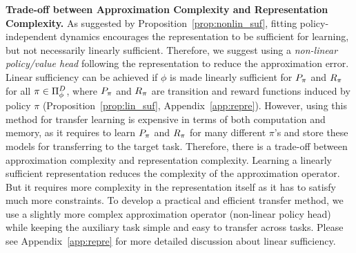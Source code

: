 \textbf{Trade-off between Approximation Complexity and Representation Complexity.}
As suggested by Proposition~\ref{prop:nonlin_suf}, fitting policy-independent dynamics encourages the representation to be sufficient for learning, but not necessarily linearly sufficient. Therefore, we suggest using a \textit{non-linear policy/value head} following the representation to reduce the approximation error. 
Linear sufficiency can be achieved if $\phi$ is made linearly sufficient for $P_\pi$ and $R_\pi$ for all $\pi\in\Pi_{\phi}^D$, where $P_\pi$ and $R_\pi$ are transition and reward functions induced by policy $\pi$ (Proposition~\ref{prop:lin_suf}, Appendix~\ref{app:repre}).
However, using this method for transfer learning is expensive in terms of both computation and memory, as it requires to learn $P_\pi$ and $R_\pi$ for many different $\pi$'s and store these models for transferring to the target task.
Therefore, there is a trade-off between approximation complexity and representation complexity. Learning a linearly sufficient representation reduces the complexity of the approximation operator. But it requires more complexity in the representation itself as it has to satisfy much more constraints. 
To develop a practical and efficient transfer method, we use a slightly more complex approximation operator (non-linear policy head) while keeping the auxiliary task simple and easy to transfer across tasks. Please see Appendix~\ref{app:repre} for more detailed discussion about linear sufficiency.

